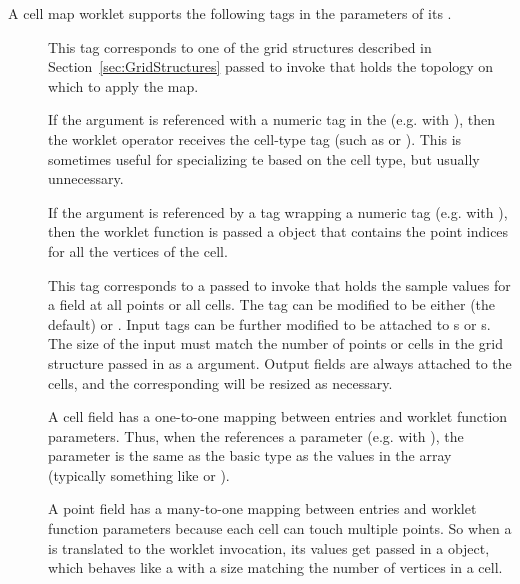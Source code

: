 A cell map worklet supports the following tags in the parameters of its
\controlsignature.
\begin{description}
\item[] This tag corresponds to one of the grid structures
  described in Section~\ref{sec:GridStructures} passed to invoke that holds
  the topology on which to apply the map.

  If the  argument is referenced with a numeric tag in the
  \executionsignature (e.g. with ), then the worklet operator
  receives the cell-type tag (such as  or
  ). This is sometimes useful for specializing te  based
  on the cell type, but usually unnecessary.

  If the  argument is referenced by a 
  tag wrapping a numeric tag (e.g. with ), then
  the worklet function is passed a  object that
  contains the point indices for all the vertices of the cell.
\item[] This tag corresponds to a 
  passed to invoke that holds the sample values for a field at all points
  or all cells. The  tag can be modified to be either
   (the default) or . Input  tags can
  be further modified to be attached to s or
  s. The size of the input  must match
  the number of points or cells in the grid structure passed in as a
   argument.  Output fields are always attached to the
  cells, and the corresponding  will be resized as
  necessary.

  A cell field has a one-to-one mapping between 
  entries and worklet function parameters. Thus, when the
  \executionsignature references a \controlsignature {}
  parameter (e.g. with ), the parameter is the same as the
  basic type as the values in the array (typically something like
   or ).

  A point field has a many-to-one mapping between 
  entries and worklet function parameters because each cell can touch
  multiple points. So when a  is translated to the
  worklet invocation, its values get passed in a 
  object, which behaves like a  with a size matching the number
  of vertices in a cell.
\end{description}

